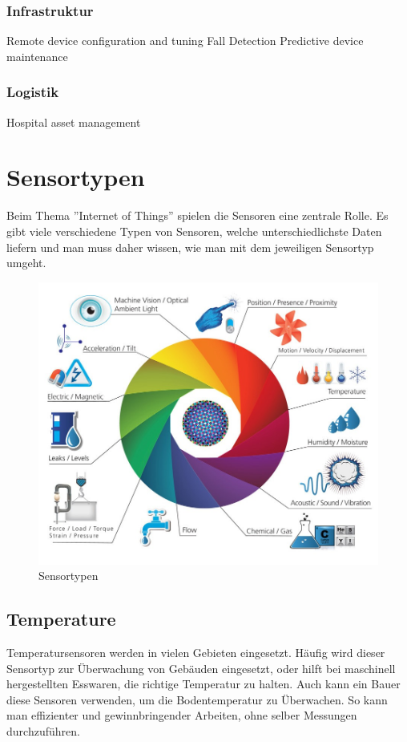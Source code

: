 \subsubsection{Infrastruktur}
Remote device configuration and tuning
Fall Detection
Predictive device maintenance
\subsubsection{Logistik}
Hospital asset management


\section{Sensortypen}
Beim Thema ''Internet of Things'' spielen die Sensoren eine zentrale Rolle. Es gibt viele verschiedene Typen von Sensoren, welche unterschiedlichste Daten liefern und man muss daher wissen, wie man mit dem jeweiligen Sensortyp umgeht. 
\begin{figure}[H]
\centering
\includegraphics[scale=0.35]{images/sensors.jpg}
\caption{Sensortypen\cite{SensorImage}}
\end{figure}

\subsection{Temperature}%
Temperatursensoren werden in vielen Gebieten eingesetzt. Häufig wird dieser Sensortyp zur Überwachung von Gebäuden eingesetzt, oder hilft bei maschinell hergestellten Esswaren, die richtige Temperatur zu halten. Auch kann ein Bauer diese Sensoren verwenden, um die Bodentemperatur zu Überwachen. So kann man effizienter und gewinnbringender Arbeiten, ohne selber Messungen durchzuführen.
